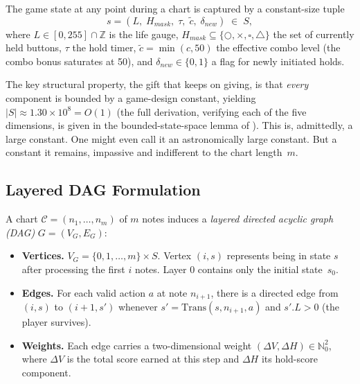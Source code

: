 \documentclass[11pt, letterpaper]{article}
\theoremstyle{definition}
\theoremstyle{remark}
\begin{document}
The game state at any point during a chart is captured by a constant-size tuple
\[
    s = (L,\; H_{\mathit{mask}},\; \tau,\; \tilde{c},\; \delta_{\mathit{new}}) \;\in\; S,
\]
where $L \in [0, 255] \cap \mathbb{Z}$ is the life gauge, $H_{\mathit{mask}} \subseteq \{\bigcirc, \times, \square, \triangle\}$ the set of currently held buttons, $\tau$ the hold timer, $\tilde{c} = \min(c, 50)$ the effective combo level (the combo bonus saturates at 50), and $\delta_{\mathit{new}} \in \{0, 1\}$ a flag for newly initiated holds.

The key structural property, the gift that keeps on giving, is that \emph{every} component is bounded by a game-design constant, yielding $|S| \approx 1.30 \times 10^8 = O(1)$ (the full derivation, verifying each of the five dimensions, is given in the bounded-state-space lemma of \cite[\S4.1]{Chang2026}).
This is, admittedly, a large constant.
One might even call it an astronomically large constant.
But a constant it remains, impassive and indifferent to the chart length~$m$.

\subsection{Layered DAG Formulation}

A chart $\mathcal{C} = (n_1, \ldots, n_m)$ of $m$ notes induces a \emph{layered directed acyclic graph (DAG)} $G = (V_G, E_G)$:
\begin{itemize}[leftmargin=*]
    \item \textbf{Vertices.} $V_G = \{0, 1, \ldots, m\} \times S$. Vertex $(i, s)$ represents being in state $s$ after processing the first $i$ notes. Layer $0$ contains only the initial state~$s_0$.
    \item \textbf{Edges.} For each valid action $a$ at note $n_{i+1}$, there is a directed edge from $(i, s)$ to $(i{+}1, s')$ whenever $s' = \mathrm{Trans}(s, n_{i+1}, a)$ and $s'.L > 0$ (the player survives).
    \item \textbf{Weights.} Each edge carries a two-dimensional weight $(\Delta V, \Delta H) \in \mathbb{N}_0^2$, where $\Delta V$ is the total score earned at this step and $\Delta H$ its hold-score component.
\end{itemize}

\end{document}
